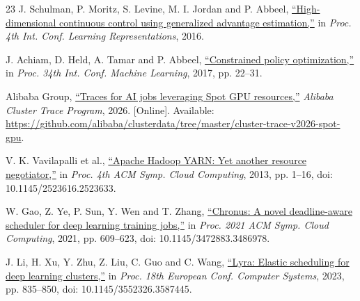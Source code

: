 \documentclass[conference]{IEEEtran}
\begin{document}
\begin{thebibliography}{23}
J. Schulman, P. Moritz, S. Levine, M. I. Jordan and P. Abbeel, \href{https://arxiv.org/abs/1506.02438}{``High-dimensional continuous control using generalized advantage estimation,''} in \emph{Proc. 4th Int. Conf. Learning Representations}, 2016.

J. Achiam, D. Held, A. Tamar and P. Abbeel, \href{https://proceedings.mlr.press/v70/achiam17a.html}{``Constrained policy optimization,''} in \emph{Proc. 34th Int. Conf. Machine Learning}, 2017, pp. 22--31.

Alibaba Group, \href{https://github.com/alibaba/clusterdata/tree/master/cluster-trace-v2026-spot-gpu}{``Traces for AI jobs leveraging Spot GPU resources,''} \emph{Alibaba Cluster Trace Program}, 2026. [Online]. Available: \url{https://github.com/alibaba/clusterdata/tree/master/cluster-trace-v2026-spot-gpu}.

V. K. Vavilapalli et al., \href{https://doi.org/10.1145/2523616.2523633}{``Apache Hadoop YARN: Yet another resource negotiator,''} in \emph{Proc. 4th ACM Symp. Cloud Computing}, 2013, pp. 1--16, doi: 10.1145/2523616.2523633.

W. Gao, Z. Ye, P. Sun, Y. Wen and T. Zhang, \href{https://doi.org/10.1145/3472883.3486978}{``Chronus: A novel deadline-aware scheduler for deep learning training jobs,''} in \emph{Proc. 2021 ACM Symp. Cloud Computing}, 2021, pp. 609--623, doi: 10.1145/3472883.3486978.

J. Li, H. Xu, Y. Zhu, Z. Liu, C. Guo and C. Wang, \href{https://doi.org/10.1145/3552326.3587445}{``Lyra: Elastic scheduling for deep learning clusters,''} in \emph{Proc. 18th European Conf. Computer Systems}, 2023, pp. 835--850, doi: 10.1145/3552326.3587445.

\end{thebibliography}
\end{document}
